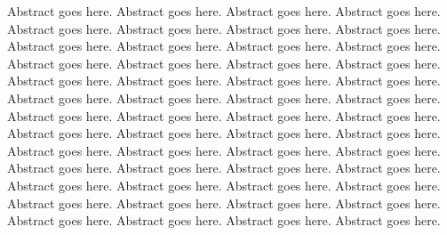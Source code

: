 Abstract goes here.  Abstract goes here.  Abstract goes here.  Abstract goes here.  Abstract goes here.  Abstract goes here.  Abstract goes here.  Abstract goes here.  Abstract goes here.  Abstract goes here.  Abstract goes here.  Abstract goes here.  Abstract goes here.  Abstract goes here.  Abstract goes here.  Abstract goes here.  Abstract goes here.  Abstract goes here.  Abstract goes here.  Abstract goes here.  Abstract goes here.  Abstract goes here.  Abstract goes here.  Abstract goes here.  Abstract goes here.  Abstract goes here.  Abstract goes here.  Abstract goes here.  Abstract goes here.  Abstract goes here.  Abstract goes here.  Abstract goes here.  Abstract goes here.  Abstract goes here.  Abstract goes here.  Abstract goes here.  Abstract goes here.  Abstract goes here.  Abstract goes here.  Abstract goes here.  Abstract goes here.  Abstract goes here.  Abstract goes here.  Abstract goes here.  Abstract goes here.  Abstract goes here.  Abstract goes here.  Abstract goes here.  Abstract goes here.  Abstract goes here.  Abstract goes here.  Abstract goes here.  



%
%



\maketitle

